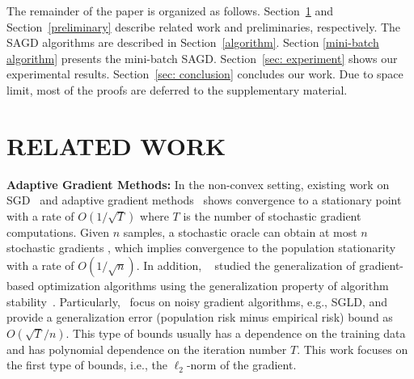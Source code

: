 \documentclass[11pt]{article}
\begin{document}
The remainder of the paper is organized as follows.
Section~\ref{related} and Section~\ref{preliminary} describe related work and preliminaries, respectively. The SAGD algorithms are described in Section~\ref{algorithm}. Section
\ref{mini-batch algorithm} presents the mini-batch SAGD. Section~\ref{sec: experiment} shows our experimental results. Section~\ref{sec: conclusion} concludes our work. Due to space limit, most of the proofs are deferred to the supplementary material.


\section{RELATED WORK}
\label{related}
{\bf Adaptive Gradient Methods:} 
In the non-convex setting, existing work on SGD~\citep{ghla2013} and adaptive gradient methods~\citep{zare18, wawu19, zosh2019, cheli2019} 
shows convergence to a stationary point with a rate of  $O(1/\sqrt{T})$
where $T$ is the number of stochastic gradient computations. Given $n$ samples, a stochastic oracle can obtain at most $n$ stochastic gradients
, which implies convergence to the population stationarity with a rate of $O(1/\sqrt{n})$.
In addition, ~\citet{kula2018, rara2017, hare2016,mowa2018, pejo2018, cheli2019, lilu2019} studied 
the generalization of gradient-based optimization algorithms using the generalization property of algorithm stability~\cite{boel02}. Particularly,~\citet{rara2017, mowa2018, lilu2019, pejo2018} focus on noisy gradient algorithms, e.g., SGLD, and provide a generalization error (population risk minus empirical risk) bound as $O(\sqrt{T}/n)$. This type of bounds usually has a dependence on the training data and has polynomial dependence on the iteration number $T$.  This work focuses on the first type of bounds, i.e., the $\ell_2$-norm of the gradient.


\vspace{0.05in}
\end{document}
